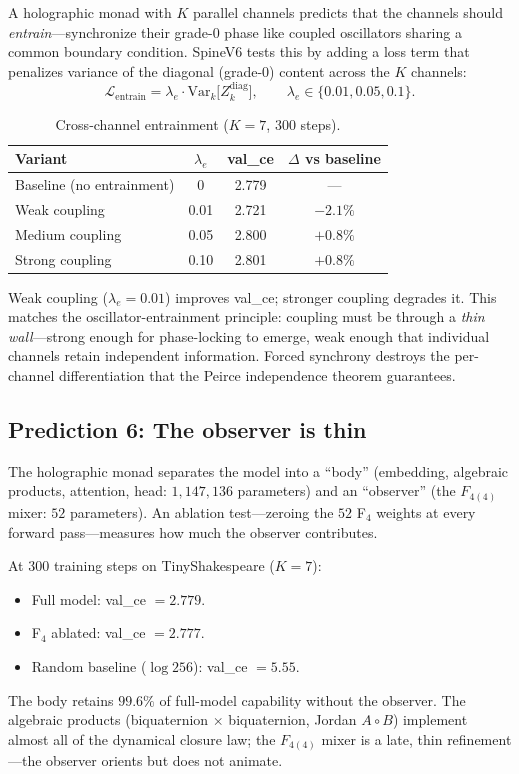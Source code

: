 \documentclass[11pt,a4paper]{article}
\theoremstyle{plain}
\theoremstyle{definition}
\theoremstyle{remark}
\numberwithin{equation}{section}
\begin{document}
A holographic monad with $K$ parallel channels predicts that the
channels should \emph{entrain}---synchronize their grade-$0$ phase
like coupled oscillators sharing a common boundary condition.
SpineV6 tests this by adding a loss term that penalizes variance
of the diagonal (grade-$0$) content across the $K$ channels:
\[
  \mathcal{L}_{\mathrm{entrain}}
  = \lambda_e \cdot \mathrm{Var}_k\!\bigl[
      Z_k^{\mathrm{diag}}\bigr],
  \qquad \lambda_e \in \{0.01, 0.05, 0.1\}.
\]

\begin{table}[ht]
\centering
\caption{Cross-channel entrainment ($K = 7$, $300$ steps).}
\label{tab:entrainment}
\renewcommand{\arraystretch}{1.2}
\small
\begin{tabular}{l c c c}
\toprule
\textbf{Variant} & $\lambda_e$ & \textbf{val\_ce} & \textbf{$\Delta$ vs baseline} \\
\midrule
Baseline (no entrainment)  & 0    & 2.779 & --- \\
Weak coupling              & 0.01 & 2.721 & $-2.1\%$ \\
Medium coupling            & 0.05 & 2.800 & $+0.8\%$ \\
Strong coupling            & 0.10 & 2.801 & $+0.8\%$ \\
\bottomrule
\end{tabular}
\end{table}

Weak coupling ($\lambda_e = 0.01$) improves val\_ce; stronger
coupling degrades it.  This matches the oscillator-entrainment
principle: coupling must be through a \emph{thin wall}---strong
enough for phase-locking to emerge, weak enough that individual
channels retain independent information.  Forced synchrony destroys
the per-channel differentiation that the Peirce independence
theorem guarantees.

\subsection{Prediction 6: The observer is thin}

The holographic monad separates the model into a ``body''
(embedding, algebraic products, attention, head: $1{,}147{,}136$
parameters) and an ``observer'' (the $F_{4(4)}$ mixer: $52$
parameters).  An ablation test---zeroing the $52$ F$_4$ weights at
every forward pass---measures how much the observer contributes.

At $300$ training steps on TinyShakespeare ($K = 7$):
\begin{itemize}[nosep]
  \item Full model: val\_ce $= 2.779$.
  \item F$_4$ ablated: val\_ce $= 2.777$.
  \item Random baseline ($\log 256$): val\_ce $= 5.55$.
\end{itemize}
The body retains $99.6\%$ of full-model capability without the
observer.  The algebraic products (biquaternion $\times$
biquaternion, Jordan $A \circ B$) implement almost all of the
dynamical closure law; the $F_{4(4)}$ mixer is a late, thin
refinement---the observer orients but does not animate.
\end{document}
